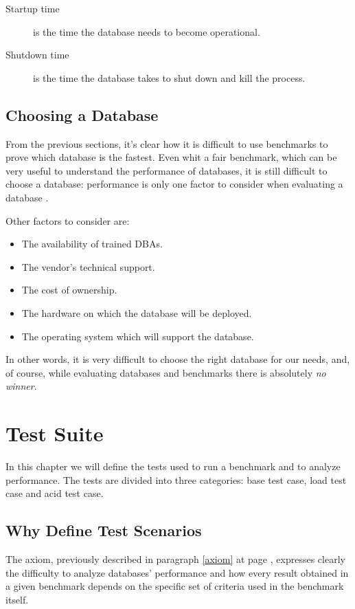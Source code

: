 \begin{description}
	\item[Startup time] is the time the database needs to become operational. 
	
	\item[Shutdown time] is the time the database takes to shut down and kill the process.
	
\end{description}
	
	\section{Choosing a Database}
From the previous sections, it's clear how it is difficult to use benchmarks to prove which database is the fastest. Even whit a fair benchmark, which can be very useful to understand the performance of databases, it is still difficult to choose a database: performance is only one factor to consider when evaluating a database \cite{burleson}. 

Other factors to consider are:
\begin{itemize}
	\item The availability of trained DBAs.
	\item The vendor's technical support.
	\item The cost of ownership.
	\item The hardware on which the database will be deployed.
	\item The operating system which will support the database.
\end{itemize}

In other words, it is very difficult to choose the right database for our needs, and, of course, while evaluating databases and benchmarks there is absolutely \emph{no winner}.


\chapter{Test Suite}	
In this chapter we will define the tests used to run a benchmark and to analyze performance. The tests are divided into three categories: base test case, load test case and acid test case.


	\section{Why Define Test Scenarios}
The axiom, previously described in paragraph \ref{axiom} at page \pageref{axiom}, expresses clearly the difficulty to analyze databases' performance and how every result obtained in a given benchmark depends on the specific set of criteria used in the benchmark itself. 

